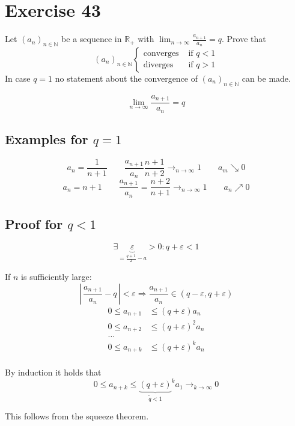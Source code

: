 \documentclass[a4paper]{article}
\theoremstyle{definition}
\newcommand\card[1]{\left|\,#1\,\right|}
\begin{document}
\section{Exercise 43}
\begin{ex}
  Let $(a_n)_{n \in \mathbb N}$ be a sequence in $\mathbb R_+$ with $\lim_{n\to\infty} \frac{a_{n+1}}{a_n} = q$.
  Prove that
  \[
    (a_n)_{n \in \mathbb N}
    \begin{cases}
      \text{converges} & \text{ if } q < 1 \\
      \text{diverges} & \text{ if } q > 1
    \end{cases}
  \]
  In case $q=1$ no statement about the convergence of $(a_n)_{n \in \mathbb N}$ can be made.
\end{ex}

\[ \lim_{n \to \infty} \frac{a_{n+1}}{a_n} = q \]

\subsection{Examples for $q = 1$}

\[ a_n = \frac{1}{n+1} \qquad \frac{a_{n+1}}{a_n} \frac{n+1}{n+2} \to_{n\to\infty} 1 \qquad a_m \searrow 0 \]
\[ a_n = n+1 \qquad \frac{a_{n+1}}{a_n} = \frac{n+2}{n+1} \to_{n\to\infty} 1 \qquad a_n \nearrow 0 \]

\subsection{Proof for $q < 1$}

\[ \exists \underbrace{\varepsilon}_{=\frac{q+1}{2} - a} > 0: q + \varepsilon < 1 \]

If $n$ is sufficiently large:
\[ \card{\frac{a_{n+1}}{a_n} - q} < \varepsilon \Rightarrow \frac{a_{n+1}}{a_n} \in (q - \varepsilon, q + \varepsilon) \]
\begin{align*}
  0 \leq a_{n+1} &\leq (q + \varepsilon) a_n \\
  0 \leq a_{n+2} &\leq (q + \varepsilon)^2 a_n \\
           \dots & \\
  0 \leq a_{n+k} &\leq (q + \varepsilon)^k a_n \\
\end{align*}

By induction it holds that
\[ 0 \leq a_{n+k} \leq {\underbrace{(q + \varepsilon)}_{\tilde{q} < 1}}^k a_1 \to_{k\rightarrow\infty} 0 \]

This follows from the squeeze theorem.
\end{document}
